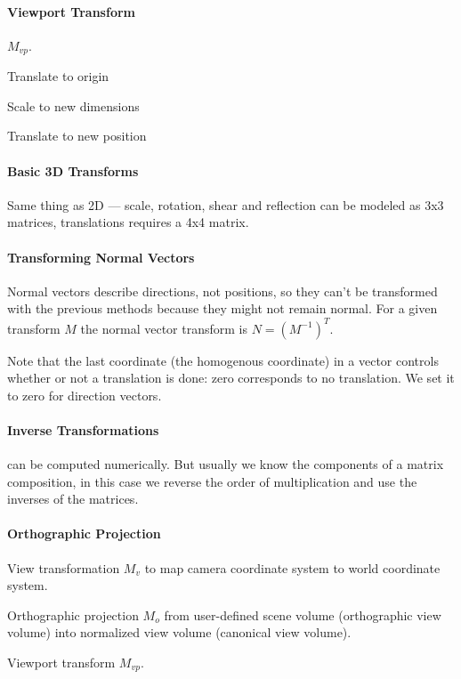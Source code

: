 \documentclass{article}
\begin{document}
\paragraph{Viewport Transform} $M_{vp}$. \begin{enumerate*}
    \item Translate to origin
    \item Scale to new dimensions
    \item Translate to new position
\end{enumerate*}

\paragraph{Basic 3D Transforms} Same thing as 2D --- scale, rotation, shear and reflection can be modeled as 3x3 matrices, translations requires a 4x4 matrix.

\paragraph{Transforming Normal Vectors} Normal vectors describe directions, not positions, so they can't be transformed with the previous methods because they might not remain normal. For a given transform $M$ the normal vector transform is $N = (M^{-1})^T$. 

Note that the last coordinate (the homogenous coordinate) in a vector controls whether or not a translation is done: zero corresponds to no translation. We set it to zero for direction vectors.

\paragraph{Inverse Transformations} can be computed numerically. But usually we know the components of a matrix composition, in this case we reverse the order of multiplication and use the inverses of the matrices.

\paragraph{Orthographic Projection} \begin{enumerate*}
    \item View transformation $M_v$ to map camera coordinate system to world coordinate system.
    \item Orthographic projection $M_o$ from user-defined scene volume (orthographic view volume) into normalized view volume (canonical view volume).
    \item Viewport transform $M_{vp}$.
\end{enumerate*}
\end{document}
